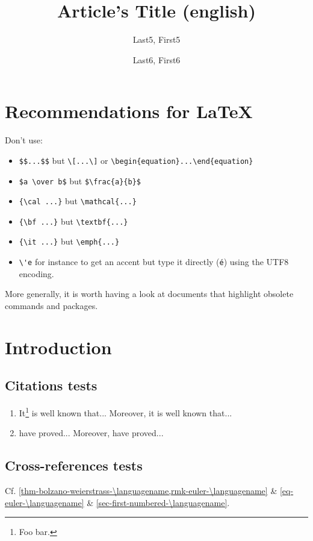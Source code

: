 \documentclass[english]{nwejmart}
\begin{document}
\title{Article's Title (english)}
\author[affiliation={Affiliation 5}]{Last5, First5}
\author[affiliation={Affiliation 6}]{Last6, First6}
%
\begin{abstract}
  \lipsum[1]
\end{abstract}
%
%
%
%
\maketitle
%
\section*{Recommendations for \LaTeX}
Don't use:
\begin{itemize}
\item \verb+$$...$$+ but \verb+\[...\]+ or \verb+\begin{equation}...\end{equation}+
\item \verb+$a \over b$+ but \verb+$\frac{a}{b}$+
\item \verb+{\cal ...}+ but \verb+\mathcal{...}+
\item \verb+{\bf ...}+ but \verb+\textbf{...}+
\item \verb+{\it ...}+ but \verb+\emph{...}+
\item \verb+\'e+ for instance to get an accent but type it directly (\verb+é+)
  using the UTF8 encoding.
\end{itemize}
More generally, it is worth having a look at documents that highlight obsolete
commands and
packages\autocite{ensenbach2016,ensenbach2011,trettin2007,ensenbach2011a,trettin2007a}.
%
\section*{Introduction}
%
\subsection{Citations tests}
\begin{enumerate}
  \item It\footnote{Foo bar.} is well known\autocite{cotton}
    that... Moreover, it is well known\autocite{coleridge} that...
  \item \textcite{cotton} have proved... Moreover, \textcite{coleridge}
    have proved...
\end{enumerate}
%
\subsection{Cross-references tests}
Cf. \vref{thm-bolzano-weierstrass-\languagename,rmk-euler-\languagename} \&
\vref{eq-euler-\languagename} \& \vref{sec-first-numbered-\languagename}.
%
\end{document}
